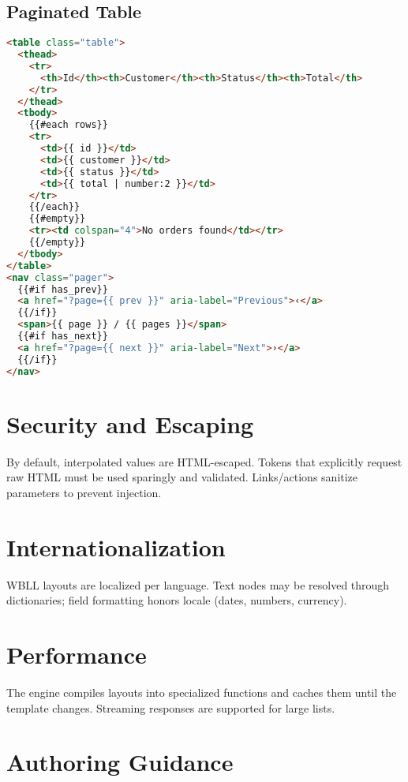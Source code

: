 \subsection{Paginated Table}
\begin{lstlisting}[language=HTML,caption={WBLL list/table (illustrative)}]
<table class="table">
  <thead>
    <tr>
      <th>Id</th><th>Customer</th><th>Status</th><th>Total</th>
    </tr>
  </thead>
  <tbody>
    {{#each rows}}
    <tr>
      <td>{{ id }}</td>
      <td>{{ customer }}</td>
      <td>{{ status }}</td>
      <td>{{ total | number:2 }}</td>
    </tr>
    {{/each}}
    {{#empty}}
    <tr><td colspan="4">No orders found</td></tr>
    {{/empty}}
  </tbody>
</table>
<nav class="pager">
  {{#if has_prev}}
  <a href="?page={{ prev }}" aria-label="Previous">‹</a>
  {{/if}}
  <span>{{ page }} / {{ pages }}</span>
  {{#if has_next}}
  <a href="?page={{ next }}" aria-label="Next">›</a>
  {{/if}}
</nav>
\end{lstlisting}

\section{Security and Escaping}
\label{sec:wbll-security}

By default, interpolated values are HTML-escaped. Tokens that explicitly request raw HTML must be used sparingly and validated. Links/actions sanitize parameters to prevent injection.

\section{Internationalization}
\label{sec:wbll-i18n}

WBLL layouts are localized per language. Text nodes may be resolved through dictionaries; field formatting honors locale (dates, numbers, currency).

\section{Performance}
\label{sec:wbll-performance}

The engine compiles layouts into specialized functions and caches them until the template changes. Streaming responses are supported for large lists.

\section{Authoring Guidance}
\label{sec:wbll-guidance}

